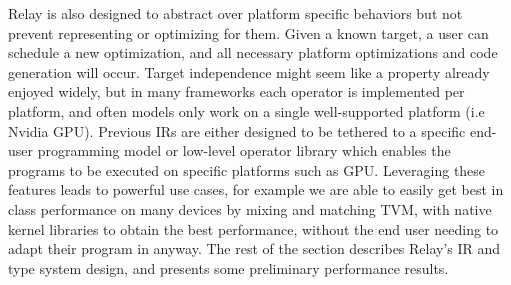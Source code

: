 Relay is also designed to abstract over platform specific behaviors but not prevent
  representing or optimizing for them.
Given a known target, a user can schedule a new optimization,
  and all necessary platform optimizations and code generation will occur.
Target independence might seem like a property already enjoyed widely,
  but in many frameworks each operator is implemented per platform,
  and often models only work on a single well-supported platform (i.e Nvidia GPU).
Previous IRs are either designed to be tethered to a specific end-user programming model
    or low-level operator library which enables the programs to be executed on specific platforms such as GPU.
Leveraging these features leads to powerful use cases,
  for example we are able to easily get best in class performance on many devices by mixing and matching TVM,
  with native kernel libraries to obtain the best performance, without the end user needing to adapt their program
  in anyway.
The rest of the section describes Relay’s IR and type system design, and presents some preliminary
  performance results.

